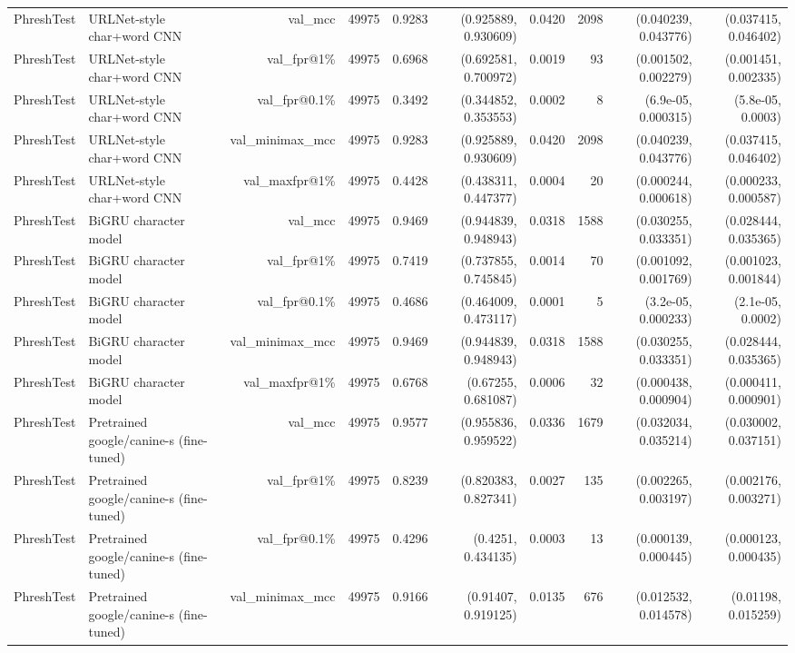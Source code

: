 \begin{table}[t]
\begin{tabular}{llrrrrrrrr}
PhreshTest & URLNet-style char+word CNN & val\_mcc & 49975 & 0.9283 & (0.925889, 0.930609) & 0.0420 & 2098 & (0.040239, 0.043776) & (0.037415, 0.046402) \\
PhreshTest & URLNet-style char+word CNN & val\_fpr@1\% & 49975 & 0.6968 & (0.692581, 0.700972) & 0.0019 & 93 & (0.001502, 0.002279) & (0.001451, 0.002335) \\
PhreshTest & URLNet-style char+word CNN & val\_fpr@0.1\% & 49975 & 0.3492 & (0.344852, 0.353553) & 0.0002 & 8 & (6.9e-05, 0.000315) & (5.8e-05, 0.0003) \\
PhreshTest & URLNet-style char+word CNN & val\_minimax\_mcc & 49975 & 0.9283 & (0.925889, 0.930609) & 0.0420 & 2098 & (0.040239, 0.043776) & (0.037415, 0.046402) \\
PhreshTest & URLNet-style char+word CNN & val\_maxfpr@1\% & 49975 & 0.4428 & (0.438311, 0.447377) & 0.0004 & 20 & (0.000244, 0.000618) & (0.000233, 0.000587) \\
PhreshTest & BiGRU character model & val\_mcc & 49975 & 0.9469 & (0.944839, 0.948943) & 0.0318 & 1588 & (0.030255, 0.033351) & (0.028444, 0.035365) \\
PhreshTest & BiGRU character model & val\_fpr@1\% & 49975 & 0.7419 & (0.737855, 0.745845) & 0.0014 & 70 & (0.001092, 0.001769) & (0.001023, 0.001844) \\
PhreshTest & BiGRU character model & val\_fpr@0.1\% & 49975 & 0.4686 & (0.464009, 0.473117) & 0.0001 & 5 & (3.2e-05, 0.000233) & (2.1e-05, 0.0002) \\
PhreshTest & BiGRU character model & val\_minimax\_mcc & 49975 & 0.9469 & (0.944839, 0.948943) & 0.0318 & 1588 & (0.030255, 0.033351) & (0.028444, 0.035365) \\
PhreshTest & BiGRU character model & val\_maxfpr@1\% & 49975 & 0.6768 & (0.67255, 0.681087) & 0.0006 & 32 & (0.000438, 0.000904) & (0.000411, 0.000901) \\
PhreshTest & Pretrained google/canine-s (fine-tuned) & val\_mcc & 49975 & 0.9577 & (0.955836, 0.959522) & 0.0336 & 1679 & (0.032034, 0.035214) & (0.030002, 0.037151) \\
PhreshTest & Pretrained google/canine-s (fine-tuned) & val\_fpr@1\% & 49975 & 0.8239 & (0.820383, 0.827341) & 0.0027 & 135 & (0.002265, 0.003197) & (0.002176, 0.003271) \\
PhreshTest & Pretrained google/canine-s (fine-tuned) & val\_fpr@0.1\% & 49975 & 0.4296 & (0.4251, 0.434135) & 0.0003 & 13 & (0.000139, 0.000445) & (0.000123, 0.000435) \\
PhreshTest & Pretrained google/canine-s (fine-tuned) & val\_minimax\_mcc & 49975 & 0.9166 & (0.91407, 0.919125) & 0.0135 & 676 & (0.012532, 0.014578) & (0.01198, 0.015259) \\

\end{tabular}
\end{table}
